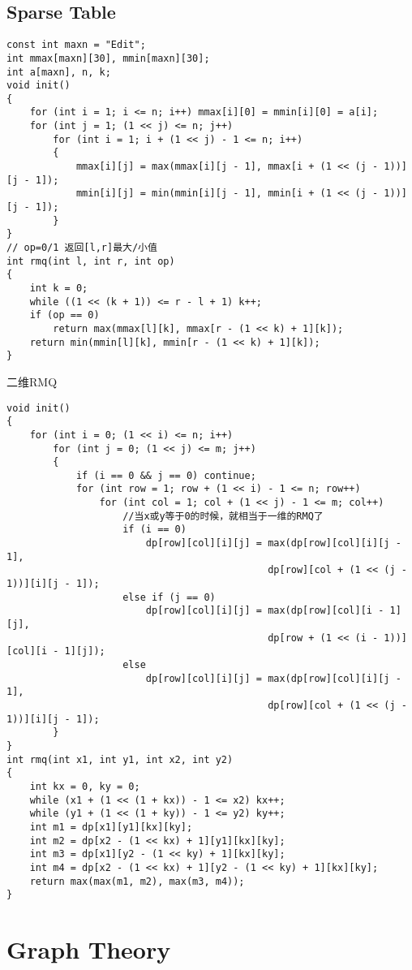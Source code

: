 \documentclass[twoside]{article}
\begin{document}
\subsection{Sparse Table}
\begin{lstlisting}
const int maxn = "Edit";
int mmax[maxn][30], mmin[maxn][30];
int a[maxn], n, k;
void init()
{
    for (int i = 1; i <= n; i++) mmax[i][0] = mmin[i][0] = a[i];
    for (int j = 1; (1 << j) <= n; j++)
        for (int i = 1; i + (1 << j) - 1 <= n; i++)
        {
            mmax[i][j] = max(mmax[i][j - 1], mmax[i + (1 << (j - 1))][j - 1]);
            mmin[i][j] = min(mmin[i][j - 1], mmin[i + (1 << (j - 1))][j - 1]);
        }
}
// op=0/1 返回[l,r]最大/小值
int rmq(int l, int r, int op)
{
    int k = 0;
    while ((1 << (k + 1)) <= r - l + 1) k++;
    if (op == 0)
        return max(mmax[l][k], mmax[r - (1 << k) + 1][k]);
    return min(mmin[l][k], mmin[r - (1 << k) + 1][k]);
}
\end{lstlisting}
二维RMQ
\begin{lstlisting}
void init()
{
    for (int i = 0; (1 << i) <= n; i++)
        for (int j = 0; (1 << j) <= m; j++)
        {
            if (i == 0 && j == 0) continue;
            for (int row = 1; row + (1 << i) - 1 <= n; row++)
                for (int col = 1; col + (1 << j) - 1 <= m; col++)
                    //当x或y等于0的时候，就相当于一维的RMQ了
                    if (i == 0)
                        dp[row][col][i][j] = max(dp[row][col][i][j - 1],
                                             dp[row][col + (1 << (j - 1))][i][j - 1]);
                    else if (j == 0)
                        dp[row][col][i][j] = max(dp[row][col][i - 1][j],
                                             dp[row + (1 << (i - 1))][col][i - 1][j]);
                    else
                        dp[row][col][i][j] = max(dp[row][col][i][j - 1],
                                             dp[row][col + (1 << (j - 1))][i][j - 1]);
        }
}
int rmq(int x1, int y1, int x2, int y2)
{
    int kx = 0, ky = 0;
    while (x1 + (1 << (1 + kx)) - 1 <= x2) kx++;
    while (y1 + (1 << (1 + ky)) - 1 <= y2) ky++;
    int m1 = dp[x1][y1][kx][ky];
    int m2 = dp[x2 - (1 << kx) + 1][y1][kx][ky];
    int m3 = dp[x1][y2 - (1 << ky) + 1][kx][ky];
    int m4 = dp[x2 - (1 << kx) + 1][y2 - (1 << ky) + 1][kx][ky];
    return max(max(m1, m2), max(m3, m4));
}
\end{lstlisting}
\clearpage\section{Graph Theory}
\end{document}
